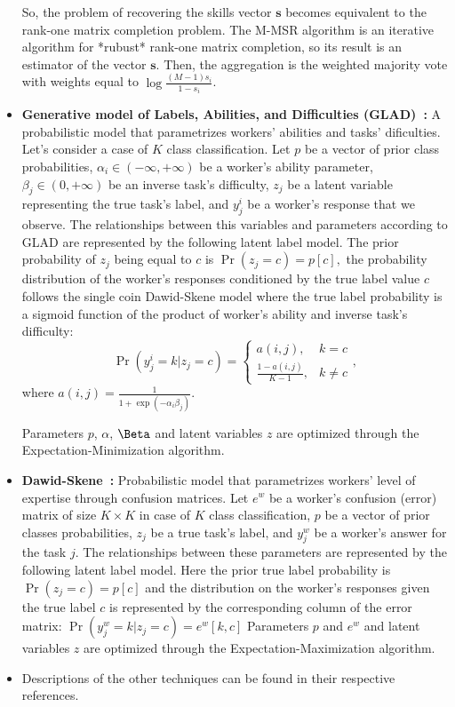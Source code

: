 \begin{itemize}
    So, the problem of recovering the skills vector $\boldsymbol{s}$ becomes equivalent to the rank-one matrix completion problem. The M-MSR algorithm is an iterative algorithm for *rubust* rank-one matrix completion, so its result is an estimator of the vector $\boldsymbol{s}$. Then, the aggregation is the weighted majority vote with weights equal to $\log \frac{(M-1)s_i}{1-s_i}$.
    \item \textbf{Generative model of Labels, Abilities, and Difficulties (GLAD)~\cite{whitehill_Whose_2009}:} A probabilistic model that parametrizes workers' abilities and tasks' dificulties. Let's consider a case of $K$ class classification. Let $p$ be a vector of prior class probabilities, $\alpha_i \in (-\infty, +\infty)$ be a worker's ability parameter, $\beta_j \in (0, +\infty)$ be an inverse task's difficulty, $z_j$ be a latent variable representing the true task's label, and $y^i_j$ be a worker's response that we observe. The relationships between this variables and parameters according to GLAD are represented by the following latent label model.
    The prior probability of $z_j$ being equal to $c$ is $\operatorname{Pr}(z_j = c) = p[c],$
    the probability distribution of the worker's responses conditioned by the true label value $c$ follows the single coin Dawid-Skene model where the true label probability is a sigmoid function of the product of worker's ability and inverse task's difficulty:
    \begin{equation}
        \operatorname{Pr}(y^i_j = k | z_j = c) = \begin{cases}a(i, j), & k = c \\ \frac{1 - a(i,j)}{K-1}, & k \neq c\end{cases},
    \end{equation}
    where $a(i,j) = \frac{1}{1 + \exp(-\alpha_i\beta_j)}.$

    Parameters $p$, $\alpha$, $\Beta$ and latent variables $z$ are optimized through the Expectation-Minimization algorithm.
    \item \textbf{Dawid-Skene~\cite{dawid_Maximum_1979}:}
    Probabilistic model that parametrizes workers' level of expertise through confusion matrices.   Let $e^w$ be a worker's confusion (error) matrix of size $K \times K$ in case of $K$ class classification, $p$ be a vector of prior classes probabilities, $z_j$ be a true task's label, and $y^w_j$ be a worker's answer for the task $j$. The relationships between these parameters are represented by the following latent label model.
    Here the prior true label probability is $\operatorname{Pr}(z_j = c) = p[c]$ and the distribution on the worker's responses given the true label $c$ is represented by the
    corresponding column of the error matrix: $\operatorname{Pr}(y_j^w = k | z_j = c) = e^w[k, c]$
    Parameters $p$ and $e^w$ and latent variables $z$ are optimized through the Expectation-Maximization algorithm.
    \item Descriptions of the other techniques can be found in their respective references.
\end{itemize}

